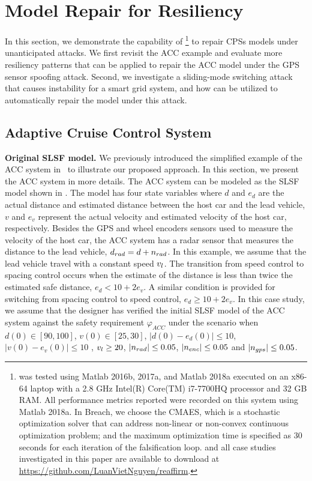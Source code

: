 \section{Model Repair for Resiliency}
%
%
In this section, we demonstrate the capability of \toolreaffirm\footnote{\toolreaffirm was tested using Matlab 2016b, 2017a, and Matlab 2018a executed on an x86-64 laptop with a 2.8 GHz Intel(R) Core(TM) i7-7700HQ processor and 32 GB RAM. All performance metrics reported were recorded on this system using Matlab 2018a. In Breach, we choose the CMAES, which is a stochastic optimization solver that can address non-linear or non-convex continuous optimization problem; and the maximum optimization time is specified as 30 seconds for each iteration of the falsification loop. \toolreaffirm and all case studies investigated in this paper are available to download at \url{https://github.com/LuanVietNguyen/reaffirm}.} to repair CPSs models under unanticipated attacks. We first revisit the ACC example and evaluate more resiliency patterns that can be applied to repair the ACC model under the GPS sensor spoofing attack. Second, we investigate a sliding-mode switching attack that causes instability for a smart grid system, and how \toolreaffirm can be utilized to automatically repair the model under this attack.

\subsection{Adaptive Cruise Control System}

{\bf Original SLSF model.} We previously introduced the simplified example of the ACC system in~ to illustrate our proposed approach. In this section, we present the ACC system in more details. The ACC system can be modeled as the SLSF model shown in . 
%
The model has four state variables where $d$ and $e_d$ are the actual distance and estimated distance between the host car and the lead vehicle, $v$ and $e_v$ represent the actual velocity and estimated velocity of the host car, respectively.  
%
Besides the GPS and wheel encoders sensors used to measure the velocity of the host car, the ACC system has a radar sensor that measures the distance to the lead vehicle, $d_{rad} = d+n_{rad}$. In this example, we assume that the lead vehicle travel with a constant speed $v_{l}$. The transition from speed control to spacing control occurs when the estimate of the distance is less than twice the estimated safe distance, \ie $e_d < 10 + 2e_v$. A similar condition is provided for switching from spacing control to speed control, \ie $e_d \geq 10 + 2e_v$. In this case study, we assume that the designer has verified the initial SLSF model of the ACC system against the safety requirement $\varphi_{ACC}$ under the scenario when $d(0) \in [90, 100]$, $v(0) \in [25, 30]$, $|d(0) - e_d(0)| \leq 10$, $|v(0) - e_v(0)| \leq 10$ , $v_{l} \geq 20$, $|n_{rad}| \leq 0.05$, $|n_{enc}| \leq 0.05$ and $|n_{gps}| \leq 0.05$.

